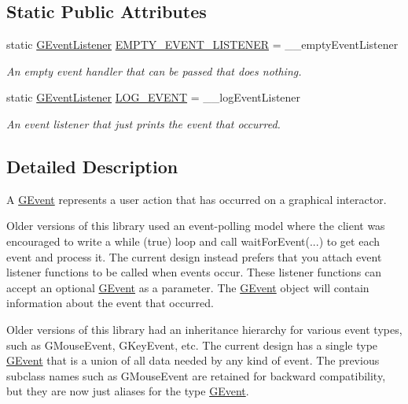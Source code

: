 \subsection*{Static Public Attributes}
\begin{DoxyCompactItemize}
\item 
static \mbox{\hyperlink{namespacesgl_ae9f3e9eab70035da1a2b114e21357b25}{G\+Event\+Listener}} \mbox{\hyperlink{classsgl_1_1GEvent_ad4e5235f4489609eefdb603ed8d19c3d}{E\+M\+P\+T\+Y\+\_\+\+E\+V\+E\+N\+T\+\_\+\+L\+I\+S\+T\+E\+N\+ER}} = \+\_\+\+\_\+empty\+Event\+Listener
\begin{DoxyCompactList}\small\item\em An empty event handler that can be passed that does nothing. \end{DoxyCompactList}\item 
static \mbox{\hyperlink{namespacesgl_ae9f3e9eab70035da1a2b114e21357b25}{G\+Event\+Listener}} \mbox{\hyperlink{classsgl_1_1GEvent_ad9cb77a13a97c2de6a7f1bcb09f961ed}{L\+O\+G\+\_\+\+E\+V\+E\+NT}} = \+\_\+\+\_\+log\+Event\+Listener
\begin{DoxyCompactList}\small\item\em An event listener that just prints the event that occurred. \end{DoxyCompactList}\end{DoxyCompactItemize}


\subsection{Detailed Description}
A \mbox{\hyperlink{classsgl_1_1GEvent}{G\+Event}} represents a user action that has occurred on a graphical interactor. 

Older versions of this library used an event-\/polling model where the client was encouraged to write a while (true) loop and call wait\+For\+Event(...) to get each event and process it. The current design instead prefers that you attach event listener functions to be called when events occur. These listener functions can accept an optional \mbox{\hyperlink{classsgl_1_1GEvent}{G\+Event}} as a parameter. The \mbox{\hyperlink{classsgl_1_1GEvent}{G\+Event}} object will contain information about the event that occurred.

Older versions of this library had an inheritance hierarchy for various event types, such as G\+Mouse\+Event, G\+Key\+Event, etc. The current design has a single type \mbox{\hyperlink{classsgl_1_1GEvent}{G\+Event}} that is a union of all data needed by any kind of event. The previous subclass names such as G\+Mouse\+Event are retained for backward compatibility, but they are now just aliases for the type \mbox{\hyperlink{classsgl_1_1GEvent}{G\+Event}}. 

